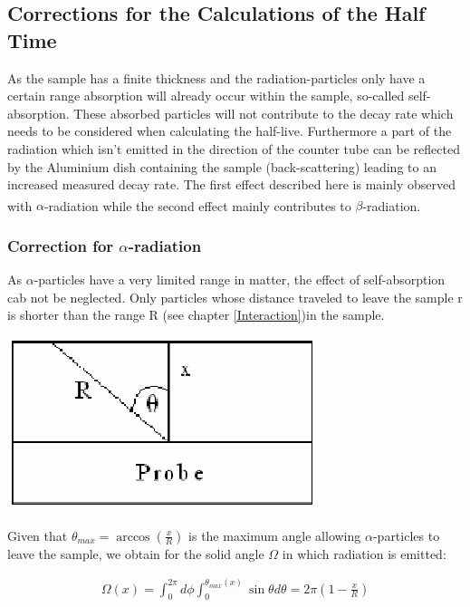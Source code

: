 \documentclass[12pt]{article}
\begin{document}
 \subsection{Corrections for the Calculations of the Half Time}
 
 As the sample has a finite thickness and the radiation-particles only have a certain range absorption will already occur within the sample, so-called self-absorption. These absorbed particles will not contribute to the decay rate which needs to be considered when calculating the half-live. Furthermore a part of the radiation which isn't emitted in the direction of the counter tube can be reflected by the Aluminium dish containing the sample (back-scattering) leading to an increased measured decay rate.
The first effect described here is mainly observed with $\alpha$-radiation while the second effect mainly contributes to $\beta$-radiation. \textsuperscript{\cite{staat}}


\subsubsection{Correction for $\alpha$-radiation}\label{alphacorrection}

As $\alpha$-particles have a very limited range in matter, the effect of self-absorption cab not be neglected. Only particles whose distance traveled to leave the sample r is shorter than the range R (see chapter \ref{Interaction})in the sample. 

%
\vskip0.5cm
\begin{minipage}{\textwidth}
	\centering
	\includegraphics[width=.25\textwidth]{figures/alpha-Korrektur.png}
\end{minipage}
\vskip0.5cm
Given that $\theta_{max}=\arccos\left( \frac{x}{R}\right)$   is the maximum angle allowing $\alpha$-particles to leave the sample, we obtain for the 
solid angle $\Omega$ in which radiation is emitted:

\begin{align}
\Omega(x)=\int_{0}^{2\pi}d\phi\int_{0}^{\theta_{max}(x)}\sin\theta d\theta = 2\pi\left( 1-\frac{x}{R}\right)
\end{align}
\end{document}
